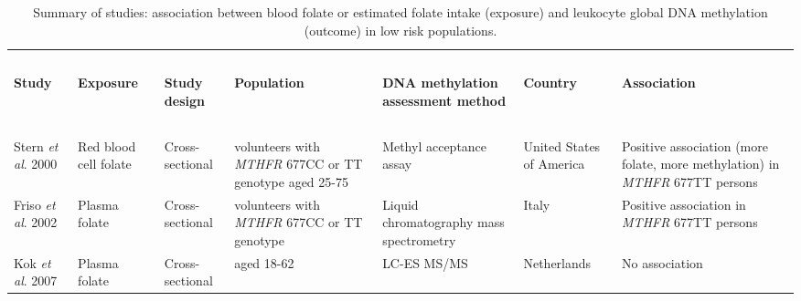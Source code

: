 \begin{center} 
\begin{sidewaystable}
\small
\caption{Summary of studies: association between blood folate or estimated folate intake (exposure) and leukocyte global DNA methylation (outcome) in low risk populations.} 
\label{table7_5}
\begin{tabular}{L{1.8cm}C{1.8cm}C{2cm}C{2.2cm}C{2.7cm}C{1.8cm}C{2.7cm}} 
\hline
~ & ~ & ~ & ~ & ~ & ~ & ~\\
\bfseries Study & \bfseries Exposure & \bfseries Study design & \bfseries Population & \bfseries DNA methylation assessment method & \bfseries Country & \bfseries Association\\
~ & ~ & ~ & ~ & ~ & ~ & ~\\
\hline
\parbox[t][3.4cm]{1.8cm}{\raggedright Stern \textit{et al}. 2000 \cite{c712}} &
\parbox[t][3.4cm]{1.8cm}{\centering Red blood cell folate} &
\parbox[t][3.4cm]{2cm}{\centering Cross-sectional} &
\parbox[t][3.4cm]{2.2cm}{ volunteers with \textit{MTHFR} 677CC or TT genotype aged 25-75} &
\parbox[t][3.4cm]{2.7cm}{\centering Methyl acceptance assay} &
\parbox[t][3.4cm]{1.8cm}{\centering United States of America} &
\parbox[t][3.4cm]{2.7cm}{\centering Positive association (more folate, more methylation) in \textit{MTHFR} 677TT persons}\\

\parbox[t][2.5cm]{1.8cm}{\raggedright Friso \textit{et al}. 2002 \cite{c76}} &
\parbox[t][2.5cm]{1.8cm}{\centering Plasma folate} &
\parbox[t][2.5cm]{2cm}{\centering Cross-sectional} &
\parbox[t][2.5cm]{2.2cm}{ volunteers with \textit{MTHFR} 677CC or TT genotype} &
\parbox[t][2.5cm]{2.7cm}{\centering Liquid chromatography mass spectrometry} &
\parbox[t][2.5cm]{1.8cm}{\centering Italy} &
\parbox[t][2.5cm]{2.7cm}{\centering Positive association in \textit{MTHFR} 677TT persons}\\

\parbox[t][1.5cm]{1.8cm}{\raggedright Kok \textit{et al}. 2007 \cite{c78}} &
\parbox[t][1.5cm]{1.8cm}{\centering Plasma folate} &
\parbox[t][1.5cm]{2cm}{\centering Cross-sectional} &
\parbox[t][1.5cm]{2.2cm}{ aged 18-62} &
\parbox[t][1.5cm]{2.7cm}{\centering LC-ES MS/MS} &
\parbox[t][1.5cm]{1.8cm}{\centering Netherlands} &
\parbox[t][1.5cm]{2.7cm}{\centering No association}\\
\hline
\end{tabular}
\end{sidewaystable}
\end{center}

